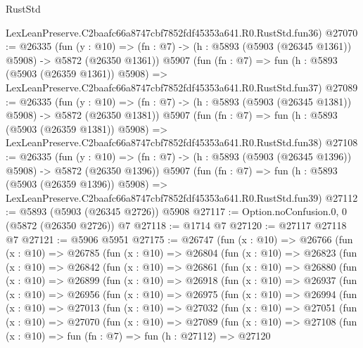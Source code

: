 \begin{lexlean}{RustStd}
\begin{coremodule}
    LexLeanPreserve.C2baafc66a8747cbf7852fdf45353a641.R0.RustStd.fun36)
@27070 := @26335
    (fun (y : @10) => (fn : @7) -> (h : @5893 (@5903 (@26345 @1361)) @5908) -> @5872 (@26350 @1361))
    @5907
    (fun (fn : @7) =>
    fun (h : @5893 (@5903 (@26359 @1361)) @5908) =>
    LexLeanPreserve.C2baafc66a8747cbf7852fdf45353a641.R0.RustStd.fun37)
@27089 := @26335
    (fun (y : @10) => (fn : @7) -> (h : @5893 (@5903 (@26345 @1381)) @5908) -> @5872 (@26350 @1381))
    @5907
    (fun (fn : @7) =>
    fun (h : @5893 (@5903 (@26359 @1381)) @5908) =>
    LexLeanPreserve.C2baafc66a8747cbf7852fdf45353a641.R0.RustStd.fun38)
@27108 := @26335
    (fun (y : @10) => (fn : @7) -> (h : @5893 (@5903 (@26345 @1396)) @5908) -> @5872 (@26350 @1396))
    @5907
    (fun (fn : @7) =>
    fun (h : @5893 (@5903 (@26359 @1396)) @5908) =>
    LexLeanPreserve.C2baafc66a8747cbf7852fdf45353a641.R0.RustStd.fun39)
@27112 := @5893 (@5903 (@26345 @2726)) @5908
@27117 := Option.noConfusion.{0, 0} (@5872 (@26350 @2726)) @7
@27118 := @1714 @7
@27120 := @27117 @27118 @7
@27121 := @5906 @5951
@27175 := @26747
    (fun (x : @10) =>
    @26766
      (fun (x : @10) =>
      @26785
        (fun (x : @10) =>
        @26804
          (fun (x : @10) =>
          @26823
            (fun (x : @10) =>
            @26842
              (fun (x : @10) =>
              @26861
                (fun (x : @10) =>
                @26880
                  (fun (x : @10) =>
                  @26899
                    (fun (x : @10) =>
                    @26918
                      (fun (x : @10) =>
                      @26937
                        (fun (x : @10) =>
                        @26956
                          (fun (x : @10) =>
                          @26975
                            (fun (x : @10) =>
                            @26994
                              (fun (x : @10) =>
                              @27013
                                (fun (x : @10) =>
                                @27032
                                  (fun (x : @10) =>
                                  @27051
                                    (fun (x : @10) =>
                                    @27070
                                      (fun (x : @10) =>
                                      @27089
                                        (fun (x : @10) =>
                                        @27108
                                          (fun (x : @10) =>
                                          fun (fn : @7) =>
                                          fun (h : @27112) =>
                                          @27120

\end{coremodule}
\end{lexlean}
